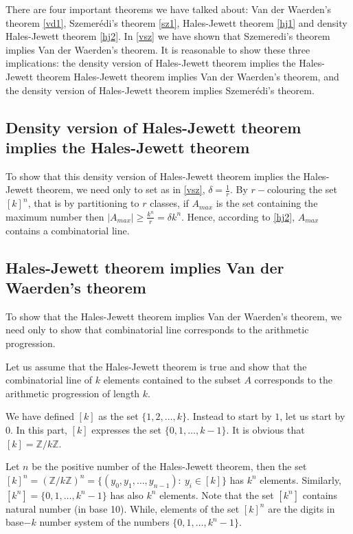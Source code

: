 There are four important theorems we have talked about: Van der Waerden's theorem \eqref{vd1}, Szemerédi's theorem \eqref{sz1}, Hales-Jewett theorem \eqref{hj1} and density Hales-Jewett theorem \eqref{hj2}. 
In \eqref{vsz} we have shown that Szemeredi's theorem implies Van der Waerden's theorem. It is reasonable to show these three implications: the density version of Hales-Jewett theorem implies the Hales-Jewett theorem Hales-Jewett theorem implies  Van der Waerden's theorem, and the density version of Hales-Jewett theorem implies Szemerédi's theorem.

\subsection{Density version of Hales-Jewett theorem implies the Hales-Jewett theorem}

To show that this density version of Hales-Jewett theorem implies the Hales-Jewett theorem, we need only to set as in  \eqref{vsz}, $\delta=\frac{1}{r}.$ By $r-$colouring the set $[k]^n$, that is by partitioning to $r$ classes,  if $A_{max}$ is the set containing the maximum number then $|A_{max}| \geq \frac{k^n}{r}=\delta k^n.$ Hence, according to \eqref{hj2}, $A_{max}$ contains a combinatorial line.

\subsection{Hales-Jewett theorem implies Van der Waerden's theorem}

To show that the Hales-Jewett theorem implies Van der Waerden's theorem, we need only to show that combinatorial line corresponds to the arithmetic progression.

Let us  assume that the Hales-Jewett theorem is true and show that the combinatorial line of $k$ elements contained to the subset $A$ corresponds to the arithmetic progression of length $k$.

We have defined $[k]$ as the set $\{1,2,\ldots, k\}.$ Instead to start by $1$, let us start by $0.$ In this part, $[k]$ expresses the set $\{0,1,\ldots, k-1\}.$ It is obvious that $[k]=\mathbb{Z}/k\mathbb{Z}.$

Let $n$ be the positive number of the Hales-Jewett theorem, then the set $[k]^n=(\mathbb{Z}/k\mathbb{Z})^n=\{(y_0,y_1, \ldots, y_{n-1}): \ y_i \in [k] \}$ has $k^n$ elements. Similarly, $[k^n]=\{0,1,\ldots, k^n-1\}$ has also $k^n$ elements. Note that the set $[k^n]$ contains natural number (in base 10). While, elements of the set $[k]^n$ are the digits  in base$-k$ number system of the numbers $\{0,1,\ldots,k^n-1\}.$

